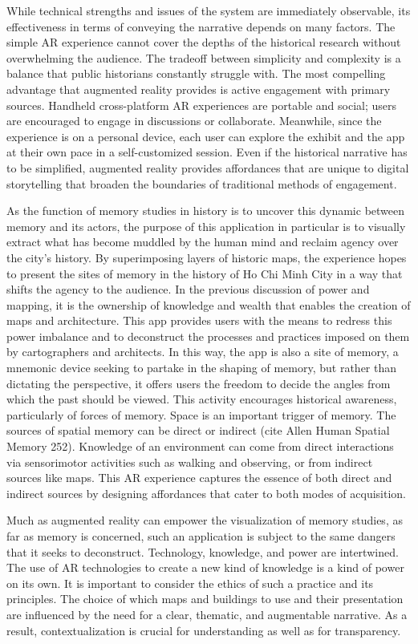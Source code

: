 While technical strengths and issues of the system are immediately observable, its effectiveness in terms of conveying the narrative depends on many factors. The simple AR experience cannot cover the depths of the historical research without overwhelming the audience. The tradeoff between simplicity and complexity is a balance that public historians constantly struggle with. The most compelling advantage that augmented reality provides is active engagement with primary sources. Handheld cross-platform AR experiences are portable and social; users are encouraged to engage in discussions or collaborate. Meanwhile, since the experience is on a personal device, each user can explore the exhibit and the app at their own pace in a self-customized session. Even if the historical narrative has to be simplified, augmented reality provides affordances that are unique to digital storytelling that broaden the boundaries of traditional methods of engagement.

As the function of memory studies in history is to uncover this dynamic between memory and its actors, the purpose of this application in particular is to visually extract what has become muddled by the human mind and reclaim agency over the city's history. By superimposing layers of historic maps, the experience hopes to present the sites of memory in the history of Ho Chi Minh City in a way that shifts the agency to the audience. In the previous discussion of power and mapping, it is the ownership of knowledge and wealth that enables the creation of maps and architecture. This app provides users with the means to redress this power imbalance and to deconstruct the processes and practices imposed on them by cartographers and architects. In this way, the app is also a site of memory, a mnemonic device seeking to partake in the shaping of memory, but rather than dictating the perspective, it offers users the freedom to decide the angles from which the past should be viewed. This activity encourages historical awareness, particularly of forces of memory. Space is an important trigger of memory. The sources of spatial memory can be direct or indirect (cite Allen Human Spatial Memory 252). Knowledge of an environment can come from direct interactions via sensorimotor activities such as walking and observing, or from indirect sources like maps. This AR experience captures the essence of both direct and indirect sources by designing affordances that cater to both modes of acquisition.

Much as augmented reality can empower the visualization of memory studies, as far as memory is concerned, such an application is subject to the same dangers that it seeks to deconstruct. Technology, knowledge, and power are intertwined. The use of AR technologies to create a new kind of knowledge is a kind of power on its own. It is important to consider the ethics of such a practice and its principles. The choice of which maps and buildings to use and their presentation are influenced by the need for a clear, thematic, and augmentable narrative. As a result, contextualization is crucial for understanding as well as for transparency.

